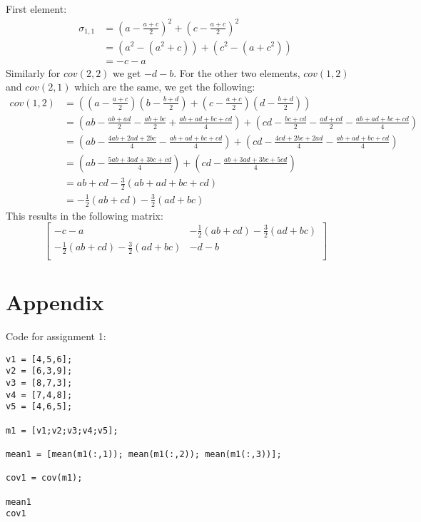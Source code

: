 \documentclass[10pt]{article}
\begin{document}
\subsection{}
First element:
\begin{align}
\sigma_{1,1} & = (a-\frac{a+c}{2})^2+(c-\frac{a+c}{2})^2 \\
& = (a^2 - (a^2 + c)) + (c^2 - (a + c^2)) \\
& = -c -a
\end{align}
Similarly for $cov(2,2)$ we get $-d-b$.
For the other two elements, $cov(1,2)$ and $cov(2,1)$ which are the same, we get the following:
\begin{align}
cov(1,2) & = ((a-\frac{a+c}{2})(b-\frac{b+d}{2})+(c-\frac{a+c}{2})(d-\frac{b+d}{2})) \\
& = (ab - \frac{ab+ad}{2} - \frac{ab + bc}{2} + \frac{ab + ad + bc + cd}{4}) + (cd - \frac{bc + cd}{2} - \frac{ad + cd}{2} - \frac{ab + ad + bc + cd}{4})\\
& = (ab - \frac{4ab + 2ad + 2bc}{4} - \frac{ab + ad + bc + cd}{4}) + (cd - \frac{4cd + 2bc + 2ad}{4} - \frac{ab + ad + bc + cd}{4}) \\
& = (ab - \frac{5ab + 3ad + 3bc + cd}{4}) + (cd - \frac{ab + 3 ad + 3 bc + 5cd}{4}) \\
& = ab + cd - \frac{3}{2}(ab + ad + bc + cd) \\
& = -\frac{1}{2}(ab + cd) - \frac{3}{2}(ad + bc)
\end{align}
This results in the following matrix:
  \begin{equation}
    \begin{bmatrix}
      -c-a & -\frac{1}{2}(ab+cd)-\frac{3}{2}(ad+bc)\\
      -\frac{1}{2}(ab+cd)-\frac{3}{2}(ad+bc) & -d-b
      \\
    \end{bmatrix}
\end{equation}

\subsection{}



\section*{Appendix}
Code for assignment 1:
\begin{lstlisting}
v1 = [4,5,6];
v2 = [6,3,9];
v3 = [8,7,3];
v4 = [7,4,8];
v5 = [4,6,5];

m1 = [v1;v2;v3;v4;v5];

mean1 = [mean(m1(:,1)); mean(m1(:,2)); mean(m1(:,3))];

cov1 = cov(m1);

mean1
cov1
\end{lstlisting}
\end{document}
